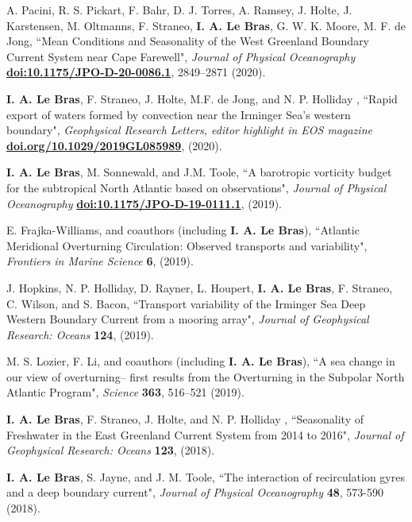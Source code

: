 \documentclass[paper=letter,fontsize=11pt]{scrartcl} %
\newcommand{\PaperEntry}[6]{
		\noindent #1, ``#2", \textit{#3} \textbf{#4}, #5 (#6).}
\begin{document}
\begin{etaremune}
\item \PaperEntry{A. Pacini, R. S. Pickart, F. Bahr, D. J. Torres, A. Ramsey, J. Holte, J. Karstensen, M. Oltmanns, F. Straneo, \textbf{I. A. Le Bras}, G. W. K. Moore, M. F. de Jong}{Mean Conditions and Seasonality of the West Greenland Boundary Current System near Cape Farewell}{Journal of Physical Oceanography}{\url{doi:10.1175/JPO-D-20-0086.1}}{2849--2871}{2020}

\item \PaperEntry{\textbf{I. A. Le Bras}, F. Straneo, J. Holte, M.F. de Jong, and N. P. Holliday }{Rapid export of waters formed by convection near the Irminger Sea's western boundary}{Geophysical Research Letters, editor highlight in EOS magazine}{\url{doi.org/10.1029/2019GL085989}}{}{2020}

\item \PaperEntry{\textbf{I. A. Le Bras}, M. Sonnewald, and J.M. Toole}{A barotropic vorticity budget for the subtropical North Atlantic based on observations}{Journal of Physical Oceanography}{\url{doi:10.1175/JPO-D-19-0111.1}}{}{2019}

\item \PaperEntry{E. Frajka-Williams, and coauthors (including \textbf{I. A. Le Bras})}{Atlantic Meridional Overturning Circulation: Observed transports and variability}{Frontiers in Marine Science}{6}{}{2019}

\item \PaperEntry{J. Hopkins, N. P. Holliday, D. Rayner, L. Houpert, \textbf{I. A. Le Bras}, F. Straneo, C. Wilson, and S. Bacon}{Transport variability of the Irminger Sea Deep Western Boundary Current from a mooring array}{Journal of Geophysical Research: Oceans}{124}{}{2019}

\item \PaperEntry{M. S. Lozier, F.  Li, and coauthors (including \textbf{I. A. Le Bras})}{A sea change in our view of overturning– first results from the
Overturning in the Subpolar North Atlantic Program}{Science}{363}{516--521}{2019}

\item \PaperEntry{\textbf{I. A. Le Bras}, F. Straneo, J. Holte, and N. P. Holliday }{Seasonality of Freshwater in the East Greenland Current
System from 2014 to 2016}{Journal of Geophysical Research: Oceans}{123}{}{2018}

\item \PaperEntry{\textbf{I. A. Le Bras}, S. Jayne, and J. M. Toole}{The interaction of recirculation gyres and a deep boundary current}{Journal of Physical Oceanography}{48}{573-590}{2018}
	

\end{etaremune}
\end{document}

